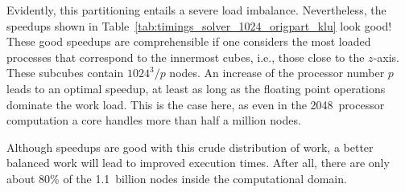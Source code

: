 \documentclass[oribibl]{llncs}
\begin{document}
Evidently, this partitioning entails a severe load imbalance.
Nevertheless, the speedups shown in
Table~\ref{tab:timings_solver_1024_origpart_klu} look good! 
These good speedups are comprehensible if one considers the most loaded
processes that correspond to the innermost cubes, i.e., those close to
the $z$-axis.  These subcubes contain $1024^3/p$ nodes.  An increase of
the processor number $p$ leads to an optimal speedup, at least as long
as the floating point operations dominate the work load.  This is the
case here, as even in the 2048~processor computation a core handles more
than half a million nodes.

Although speedups are good with this crude distribution of work, a
better balanced work will lead to improved execution times.  After all,
there are only about 80\% of the 1.1~billion nodes inside the
computational domain.
\end{document}
